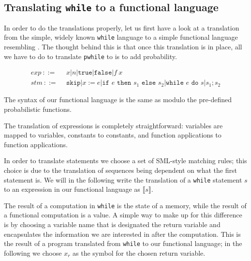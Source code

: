 \documentclass[11pt, leqno, titlepage]{article}
\theoremstyle{definition}
\begin{document}
\subsection{Translating \texttt{while} to a functional language}
% 
In order to do the translations properly, let us first have a look at a translation
from the simple, widely known \texttt{while} language to a simple functional language
resembling \rml. The thought behind this is that once this translation is in place,
all we have to do to translate \texttt{pwhile} to \rml is to add probability.

\begin{align}
  \label{eq:while}
  exp~  ::=~~ & x \vert n \vert \texttt{true} \vert \texttt{false} \vert f~x \\
  stm~  ::=~~ & \texttt{skip} \vert x := e
               \vert \texttt{if } e \texttt{ then } s_1 \texttt{ else } s_2
               \vert \texttt{while } e \texttt{ do } s \vert s_1;s_2
\end{align}

The syntax of our functional language is the same as \rml modulo the pre-defined
probabilistic functions.

The translation of expressions is completely straightforward: variables are mapped to
variables, constants to constants, and function applications to function applications. 

In order to translate statements we choose a set of SML-style matching rules; this
choice is due to the translation of sequences being dependent on what the first
statement is. We will in the following write the translation of a \texttt{while}
statement $s$ to an expression in our functional language as $\llbracket s
\rrbracket$. 

The result of a computation in \texttt{while} is the state of a memory, while the
result of a functional computation is a value. A simple way to make up for this
difference is by choosing a variable name that is designated the return variable and
encapsulates the information we are interested in after the computation. This is the
result of a program translated from \texttt{while} to our functional language; in the
following we choose $x_r$ as the symbol for the chosen return variable. 
\end{document}
